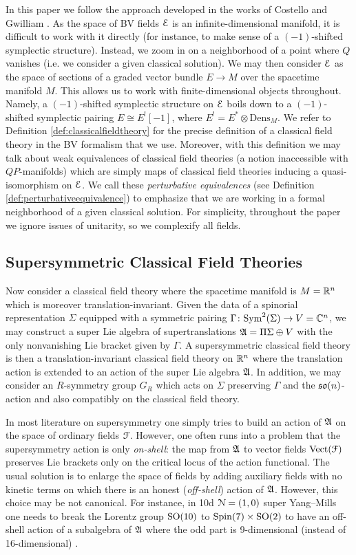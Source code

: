 \documentclass[10pt, oneside]{article}
\newcommand{\Dens}{\mathrm{Dens}}
\begin{document}
In this paper we follow the approach developed in the works of Costello and Gwilliam \cite{CostelloBook,Book1}. As the space of BV fields $\mathcal E$ is an infinite-dimensional manifold, it is difficult to work with it directly (for instance, to make sense of a $(-1)$-shifted symplectic structure). Instead, we zoom in on a neighborhood of a point where $Q$ vanishes (i.e. we consider a given classical solution). We may then consider $\mathcal E$ as the space of sections of a graded vector bundle $E\rightarrow M$ over the spacetime manifold $M$. This allows us to work with finite-dimensional objects throughout. Namely, a $(-1)$-shifted symplectic structure on $\mathcal E$ boils down to a $(-1)$-shifted symplectic pairing $E\cong E^![-1]$, where $E^!=E^*\otimes \Dens_M$. We refer to Definition \ref{def:classicalfieldtheory} for the precise definition of a classical field theory in the BV formalism that we use. Moreover, with this definition we may talk about weak equivalences of classical field theories (a notion inaccessible with $QP$-manifolds) which are simply maps of classical field theories inducing a quasi-isomorphism on $\mathcal E$. We call these \emph{perturbative equivalences} (see Definition \ref{def:perturbativeequivalence}) to emphasize that we are working in a formal neighborhood of a given classical solution. For simplicity, throughout the paper we ignore issues of unitarity, so we complexify all fields.

\subsection*{Supersymmetric Classical Field Theories}

Now consider a classical field theory where the spacetime manifold is $M=\mathbb R^n$ which is moreover translation-invariant. Given the data of a spinorial representation $\Sigma$ equipped with a symmetric pairing $\Gamma\colon{\rm Sym}^2(\Sigma)\rightarrow V=\mathbb C^n$, we may construct a super Lie algebra of supertranslations $\mathfrak A=\Pi\Sigma\oplus V$ with the only nonvanishing Lie bracket given by $\Gamma$. A supersymmetric classical field theory is then a translation-invariant classical field theory on $\mathbb R^n$ where the translation action is extended to an action of the super Lie algebra $\mathfrak A$. In addition, we may consider an $R$-symmetry group $G_R$ which acts on $\Sigma$ preserving $\Gamma$ and the $\mathfrak{so}(n)$-action and also compatibly on the classical field theory.

In most literature on supersymmetry one simply tries to build an action of $\mathfrak A$ on the space of ordinary fields $\mathcal F$. However, one often runs into a problem that the supersymmetry action is only \emph{on-shell}: the map from $\mathfrak A$ to vector fields $\mathrm{Vect}(\mathcal F)$ preserves Lie brackets only on the critical locus of the action functional. The usual solution is to enlarge the space of fields by adding auxiliary fields with no kinetic terms on which there is an honest (\emph{off-shell}) action of $\mathfrak A$. However, this choice may be not canonical. For instance, in 10d $\mathcal N=(1, 0)$ super Yang--Mills one needs to break the Lorentz group $\mathrm{SO}(10)$ to $\mathrm{Spin}(7)\times\mathrm{SO}(2)$ to have an off-shell action of a subalgebra of $\mathfrak A$ where the odd part is 9-dimensional (instead of 16-dimensional) \cite{BaulieuBerkovitsBossardMartin}.
\end{document}
